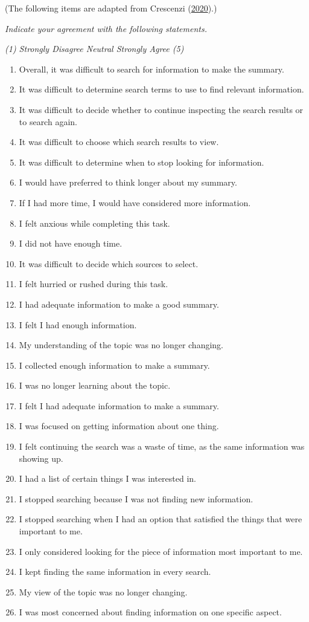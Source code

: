 \documentclass[letterpaper, nobind]{templates/ociamthesis}
\begin{document}
(The following items are adapted from Crescenzi (\protect\hyperlink{ref-crescenzi2020adaptation}{2020}).)

\emph{Indicate your agreement with the following statements.}

\emph{(1) Strongly Disagree \textbar{} Neutral \textbar{} Strongly Agree (5)}

\begin{enumerate}
\def\labelenumi{\arabic{enumi}.}
\setcounter{enumi}{14}
\item
  Overall, it was difficult to search for information to make the
  summary.
\item
  It was difficult to determine search terms to use to find relevant
  information.
\item
  It was difficult to decide whether to continue inspecting the search
  results or to search again.
\item
  It was difficult to choose which search results to view.
\item
  It was difficult to determine when to stop looking for information.
\item
  I would have preferred to think longer about my summary.
\item
  If I had more time, I would have considered more information.
\item
  I felt anxious while completing this task.
\item
  I did not have enough time.
\item
  It was difficult to decide which sources to select.
\item
  I felt hurried or rushed during this task.
\item
  I had adequate information to make a good summary.
\item
  I felt I had enough information.
\item
  My understanding of the topic was no longer changing.
\item
  I collected enough information to make a summary.
\item
  I was no longer learning about the topic.
\item
  I felt I had adequate information to make a summary.
\item
  I was focused on getting information about one thing.
\item
  I felt continuing the search was a waste of time, as the same
  information was showing up.
\item
  I had a list of certain things I was interested in.
\item
  I stopped searching because I was not finding new information.
\item
  I stopped searching when I had an option that satisfied the things
  that were important to me.
\item
  I only considered looking for the piece of information most
  important to me.
\item
  I kept finding the same information in every search.
\item
  My view of the topic was no longer changing.
\item
  I was most concerned about finding information on one specific
  aspect.
\end{enumerate}
\end{document}
